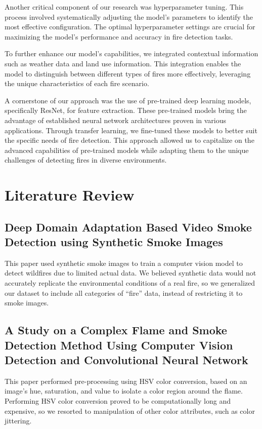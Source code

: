 Another critical component of our research was hyperparameter tuning. This process involved systematically adjusting the model's parameters to identify the most effective configuration. The optimal hyperparameter settings are crucial for maximizing the model's performance and accuracy in fire detection tasks.

To further enhance our model's capabilities, we integrated contextual information such as weather data and land use information. This integration enables the model to distinguish between different types of fires more effectively, leveraging the unique characteristics of each fire scenario.

A cornerstone of our approach was the use of pre-trained deep learning models, specifically ResNet, for feature extraction. These pre-trained models bring the advantage of established neural network architectures proven in various applications. Through transfer learning, we fine-tuned these models to better suit the specific needs of fire detection. This approach allowed us to capitalize on the advanced capabilities of pre-trained models while adapting them to the unique challenges of detecting fires in diverse environments.

\section{Literature Review}

\subsection{Deep Domain Adaptation Based Video Smoke Detection using Synthetic Smoke Images~\citep{Xu2017}}

This paper used synthetic smoke images to train a computer vision model to detect wildfires due to limited actual data. We believed synthetic data would not accurately replicate the environmental conditions of a real fire, so we generalized our dataset to include all categories of ``fire'' data, instead of restricting it to smoke images.

\subsection{A Study on a Complex Flame and Smoke Detection Method Using Computer Vision Detection and Convolutional Neural Network
	~\citep{fire5040108}}

This paper performed pre-processing using HSV color conversion, based on an image's hue, saturation, and value to isolate a color region around the flame. Performing HSV color conversion proved to be computationally long and expensive, so we resorted to manipulation of other color attributes, such as color jittering.

